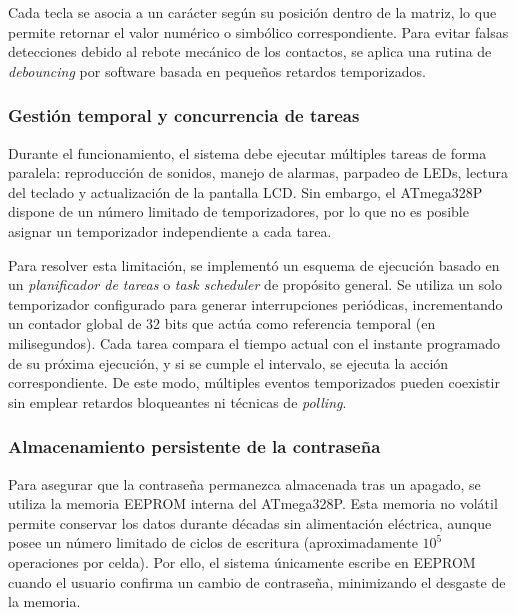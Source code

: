 Cada tecla se asocia a un carácter según su posición dentro de la matriz, lo que permite retornar el valor numérico o simbólico correspondiente. Para evitar falsas detecciones debido al rebote mecánico de los contactos, se aplica una rutina de \textit{debouncing} por software basada en pequeños retardos temporizados.

\vspace{1em}

\subsubsection{Gestión temporal y concurrencia de tareas}

Durante el funcionamiento, el sistema debe ejecutar múltiples tareas de forma paralela: reproducción de sonidos, manejo de alarmas, parpadeo de LEDs, lectura del teclado y actualización de la pantalla LCD. Sin embargo, el ATmega328P dispone de un número limitado de temporizadores, por lo que no es posible asignar un temporizador independiente a cada tarea.

Para resolver esta limitación, se implementó un esquema de ejecución basado en un \textit{planificador de tareas} o \textit{task scheduler} de propósito general. Se utiliza un solo temporizador configurado para generar interrupciones periódicas, incrementando un contador global de 32 bits que actúa como referencia temporal (en milisegundos). Cada tarea compara el tiempo actual con el instante programado de su próxima ejecución, y si se cumple el intervalo, se ejecuta la acción correspondiente. De este modo, múltiples eventos temporizados pueden coexistir sin emplear retardos bloqueantes ni técnicas de \textit{polling}.

\vspace{1em}

\subsubsection{Almacenamiento persistente de la contraseña}

Para asegurar que la contraseña permanezca almacenada tras un apagado, se utiliza la memoria EEPROM interna del ATmega328P. Esta memoria no volátil permite conservar los datos durante décadas sin alimentación eléctrica, aunque posee un número limitado de ciclos de escritura (aproximadamente $10^5$ operaciones por celda). Por ello, el sistema únicamente escribe en EEPROM cuando el usuario confirma un cambio de contraseña, minimizando el desgaste de la memoria.


